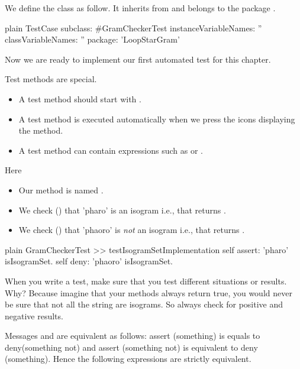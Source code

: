 \documentclass[10pt,twoside,english]{_support/latex/sbabook/sbabook}
\begin{document}
We define the class  as follow. It inherits from  and belongs to the package .

\begin{displaycode}{plain}
TestCase subclass: #GramCheckerTest
	instanceVariableNames: ''
	classVariableNames: ''
	package: 'LoopStarGram'
\end{displaycode}

Now we are ready to implement our first automated test for this chapter. 

Test methods are special.

\begin{itemize}
\item A test method should start with .
\item A test method is executed automatically when we press the icons displaying the method.
\item A test method can contain expressions such as  or . 
\end{itemize}

Here 

\begin{itemize}
\item Our method is named .
\item We check () that 'pharo' is an isogram i.e., that  returns . 
\item We check () that 'phaoro' is \textit{not} an isogram i.e., that  returns .
\end{itemize}

\begin{displaycode}{plain}
GramCheckerTest >> testIsogramSetImplementation
	self assert: 'pharo' isIsogramSet.
	self deny: 'phaoro' isIsogramSet.
\end{displaycode}

\begin{important}
When you write a test, make sure that you test different situations or results. Why? Because imagine that your methods always return true, you would never be sure that not all the string are isograms. So always check for positive and negative results. 
\end{important}

Messages  and  are equivalent as follows: assert (something) is equals to deny(something not) and assert (something not) is equivalent to deny (something). Hence the following expressions are strictly equivalent. 
	
\end{document}
